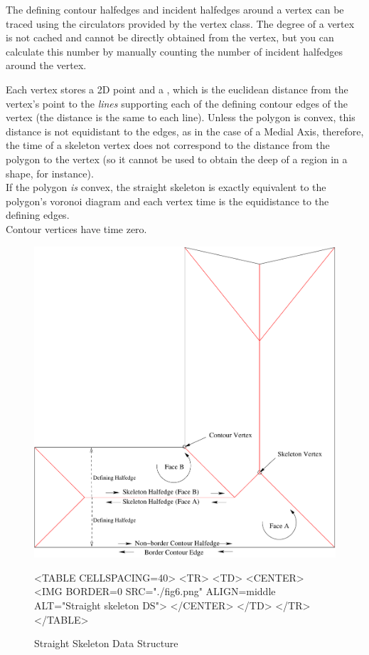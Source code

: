 The defining contour halfedges and incident halfedges around a vertex can be traced using the circulators provided by the vertex class. The degree of a vertex is not cached and cannot be directly obtained from the vertex, but you can calculate this number by manually counting the number of incident halfedges around the vertex.

Each vertex stores a 2D point and a , which is the euclidean distance from the vertex's point to the \textit{lines} supporting each of the defining contour edges of the vertex (the distance is the same to each line). Unless the polygon is convex, this distance is not equidistant to the edges, as in the case of a Medial Axis, therefore, the time of a skeleton vertex does not correspond to the distance from the polygon to the vertex (so it cannot be used to obtain the deep of a region in a shape, for instance).\\
If the polygon \textit{is} convex, the straight skeleton is exactly equivalent to the polygon's voronoi diagram and each vertex time is the equidistance to the defining edges.\\
Contour vertices have time zero.

\begin{figure}[htbp]
\begin{ccTexOnly}
\begin{center}
\includegraphics{Straight_skeleton_2/fig6} %
\end{center}
\end{ccTexOnly}

\begin{ccHtmlOnly}
<TABLE CELLSPACING=40>
<TR>
<TD>
<CENTER>
<IMG BORDER=0 SRC="./fig6.png" ALIGN=middle ALT="Straight skeleton DS">
</CENTER>
</TD>
</TR>
</TABLE>
\end{ccHtmlOnly}

\caption{Straight Skeleton Data Structure
\label{Simplepoly-offsets}}
\end{figure}

